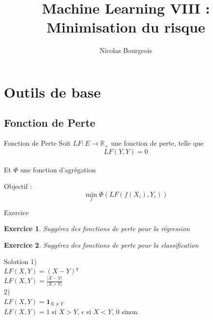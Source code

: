 \documentclass[11pt]{beamer}
\title{Machine Learning VIII : Minimisation du risque}
\author{Nicolas Bourgeois}
\date{}
\newtheorem{exercice}{Exercice}
\begin{document}
\begin{frame}
\maketitle
\end{frame}

\begin{frame}
\tableofcontents
\end{frame}


\section{Outils de base}

\subsection{Fonction de Perte} 

\begin{frame}{Fonction de Perte}
Soit $LF:E \rightarrow \mathbb{R}_+$ une fonction de perte, telle que
$$LF(Y,Y) = 0$$\\
Et $\Phi$ une fonction d'agrégation

Objectif :
$$ \min_f \Phi \left( LF(f(X_i),Y_i) \right)$$

\end{frame}

\begin{frame}{Exercice}
\begin{exercice}
Suggérez des fonctions de perte pour la régression
\end{exercice}

\vspace{0.3cm}

\begin{exercice}
Suggérez des fonctions de perte pour la classification
\end{exercice}
\end{frame}

\begin{frame}{Solution}
1)\\
$LF(X,Y) = (X-Y)^q$\\
$LF(X,Y) = \frac{|X-Y|}{|X+Y|}$\\
\vspace{0.3cm}
2)\\

$LF(X,Y) = \mathbf{1}_{X\neq Y}$\\
$LF(X,Y) = 1$ si $X>Y$, $\epsilon$ si $X<Y$, $0$ sinon.  

\end{frame}
\end{document}
